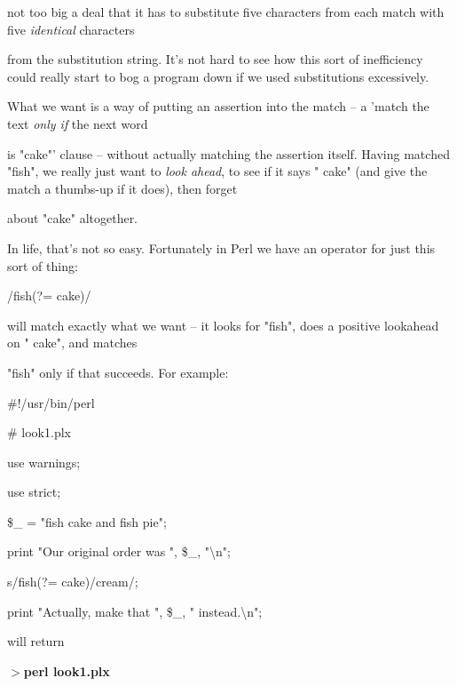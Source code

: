 \documentclass[a4paper,11pt]{book}
\begin{document}
\noindent not too big a deal that it has to substitute five characters from each match with five \textit{identical }characters

\noindent from the substitution string. It's not hard to see how this sort of inefficiency could really start to bog a program down if we used substitutions excessively.

\noindent 

\noindent What we want is a way of  putting  an  assertion  into  the  match  --  a  'match  the text  \textit{only if  }the  next word

\noindent is  "cake"'  clause -- without actually  matching  the  assertion  itself.  Having  matched  "fish",  we  really  just want to  \textit{look ahead},  to  see if it  says  "  cake"  (and  give  the  match  a  thumbs-up  if  it  does),  then  forget

\noindent about "cake" altogether.

\noindent 

\noindent In life, that's not so easy. Fortunately in Perl we have an operator for just this sort of thing:

\noindent 

\noindent /fish(?= cake)/

\noindent 

\noindent will match exactly what we want -- it looks for "fish", does a positive lookahead on " cake", and matches

\noindent "fish" only if that succeeds. For example:

\noindent 

\noindent \#!/usr/bin/perl

\noindent \# look1.plx

\noindent use warnings;

\noindent use strict;

\noindent 

\noindent \$\_  = "fish cake and fish pie";

\noindent print "Our original order was ", \$\_, "\textbackslash n";

\noindent 

\noindent s/fish(?= cake)/cream/;

\noindent print "Actually, make that ", \$\_, " instead.\textbackslash n";

\noindent 

\noindent will return

\noindent 

\noindent $>$\textbf{perl look1.plx}
\end{document}
